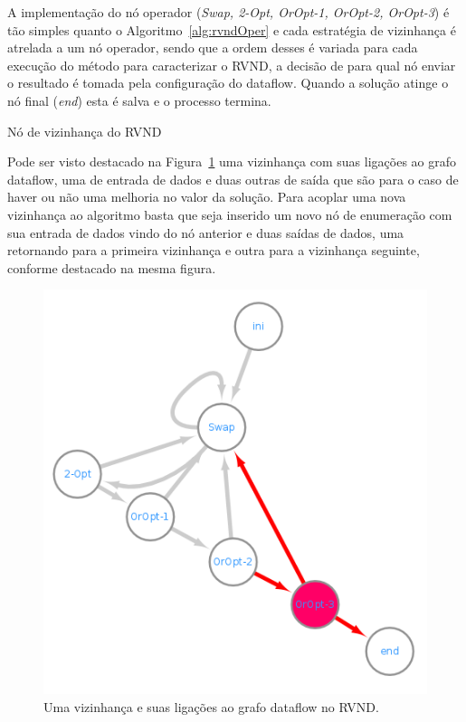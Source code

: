 A implementação do nó operador (\textit{Swap, 2-Opt, OrOpt-1, OrOpt-2, OrOpt-3}) é tão simples quanto o Algoritmo~\ref{alg:rvndOper} e cada estratégia de vizinhança é atrelada a um nó operador, sendo que a ordem desses é variada para cada execução do método para caracterizar o RVND, a decisão de para qual nó enviar o resultado é tomada pela configuração do dataflow.
Quando a solução atinge o nó final (\textit{end}) esta é salva e o processo termina.

\begin{algorithm}[htpb]
\caption{Nó de vizinhança do RVND}
\label{alg:rvndOper}
\begin{algorithmic}[1]
    \EndFunction
\end{algorithmic}
\end{algorithm}

Pode ser visto destacado na Figura~\ref{fig:rvndGraphDestacado} uma vizinhança com suas ligações ao grafo dataflow, uma de entrada de dados e duas outras de saída que são para o caso de haver ou não uma melhoria no valor da solução.
Para acoplar uma nova vizinhança ao algoritmo basta que seja inserido um novo nó de enumeração com sua entrada de dados vindo do nó anterior e duas saídas de dados, uma retornando para a primeira vizinhança e outra para a vizinhança seguinte, conforme destacado na mesma figura.

\begin{figure}[htbp]
    \centerline{\includegraphics[scale=0.5]{figuras/rvnd/RVND_dataflow_nomesDestacado.png}}
    \caption{Uma vizinhança e suas ligações ao grafo dataflow no RVND.}
    \label{fig:rvndGraphDestacado}
\end{figure}

